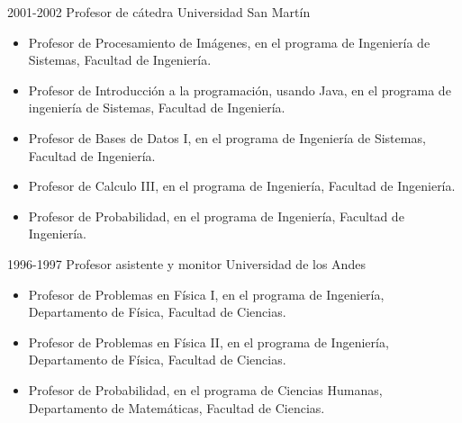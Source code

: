 \begin{entrylist}
  \entry
        {2001-2002}
	{Profesor de cátedra}
	{Universidad San Martín}
	{\begin{itemize}
              \item Profesor de Procesamiento de Imágenes, en el programa de Ingeniería de Sistemas,
Facultad de Ingeniería.
              \item Profesor de Introducción a la programación, usando Java, en el programa de
		      ingeniería de Sistemas, Facultad de Ingeniería.
              \item Profesor de Bases de Datos I, en el programa de Ingeniería de Sistemas, Facultad
		      de Ingeniería.
              \item Profesor de Calculo III, en el programa de Ingeniería, Facultad de Ingeniería.
              \item Profesor de Probabilidad, en el programa de Ingeniería, Facultad de Ingeniería.
	\end{itemize}}
  \entry
        {1996-1997}
	{Profesor asistente y monitor}
	{Universidad de los Andes}
	{\begin{itemize}
              \item Profesor de Problemas en Física I, en el programa de Ingeniería,
		      Departamento de Física, Facultad de Ciencias.
              \item Profesor de Problemas en Física II, en el programa de Ingeniería,
		      Departamento de Física, Facultad de Ciencias.
              \item Profesor de Probabilidad, en el programa de Ciencias Humanas, Departamento
		      de Matemáticas, Facultad de Ciencias.
	\end{itemize}}
\end{entrylist}

